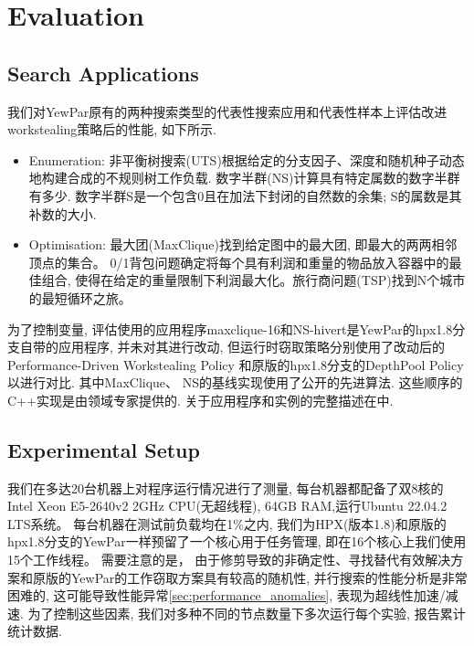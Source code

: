 \documentclass{mproj}
\begin{document}
\chapter{Evaluation}

\section{Search Applications}

我们对YewPar原有的两种搜索类型的代表性搜索应用和代表性样本上评估改进workstealing策略后的性能,
如下所示.

\begin{itemize}
    \item Enumeration:
          非平衡树搜索(UTS)根据给定的分支因子、深度和随机种子动态地构建合成的不规则树工作负载\cite{olivier2006uts}.
          数字半群(NS)计算具有特定属数的数字半群有多少\cite{fromentin2016exploring}.
          数字半群S是一个包含0且在加法下封闭的自然数的余集;
          S的属数是其补数的大小.
    \item Optimisation:
          最大团(MaxClique)找到给定图中的最大团,
          即最大的两两相邻顶点的集合。
          0/1背包问题确定将每个具有利润和重量的物品放入容器中的最佳组合,
          使得在给定的重量限制下利润最大化。旅行商问题(TSP)找到N个城市的最短循环之旅。
\end{itemize}

为了控制变量,
评估使用的应用程序maxclique-16和NS-hivert是YewPar的hpx1.8分支自带的应用程序,
并未对其进行改动,
但运行时窃取策略分别使用了改动后的Performance-Driven Workstealing Policy
和原版的hpx1.8分支的DepthPool Policy以进行对比.
其中MaxClique\cite{mccreesh2013multithreading}、
NS\cite{fromentin2016exploring}的基线实现使用了公开的先进算法.
这些顺序的C++实现是由领域专家提供的.
关于应用程序和实例的完整描述在\cite{archibald2018}中.


\section{Experimental Setup}
我们在多达20台机器上对程序运行情况进行了测量,
每台机器都配备了双8核的Intel Xeon E5-2640v2 2GHz CPU(无超线程),
64GB RAM,运行Ubuntu 22.04.2 LTS系统。
每台机器在测试前负载均在1\%之内,
我们为HPX(版本1.8)和原版的hpx1.8分支的YewPar一样预留了一个核心用于任务管理,
即在16个核心上我们使用15个工作线程。
需要注意的是，
由于修剪导致的非确定性、寻找替代有效解决方案和原版的YewPar的工作窃取方案具有较高的随机性,
并行搜索的性能分析是非常困难的,
这可能导致性能异常\ref{sec:performance_anomalies},
表现为超线性加速/减速.
为了控制这些因素,
我们对多种不同的节点数量下多次运行每个实验,
报告累计统计数据.
\end{document}

